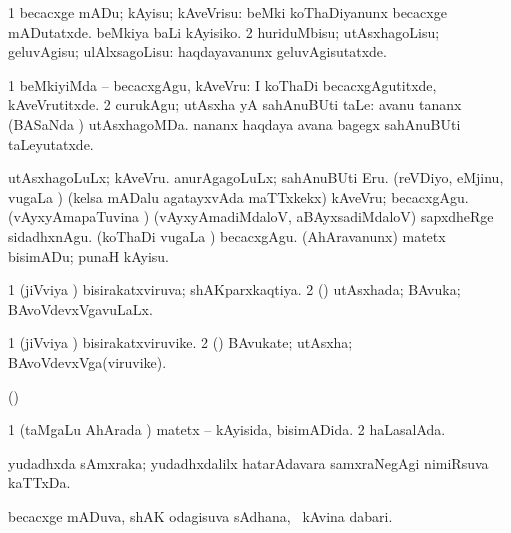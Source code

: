 {\bentry
{} 
\gl{\sakirx}
\expl{}
\bmng
\bnum
\num{1} becacxge mADu; kAyisu; kAveVrisu:  beMki koThaDiyanunx becacxge mADutatxde.  beMkiya baLi kAyisiko. 
\num{2} huriduMbisu; utAsxhagoLisu; geluvAgisu; ulAlxsagoLisu:  haqdayavanunx geluvAgisutatxde. 
\enum
\emng

\noindent 
\gl{\akirx}
\expl{}
\bmng
\bnum
\num{1} beMkiyiMda -- becacxgAgu, kAveVru:  I koThaDi becacxgAgutitxde, kAveVrutitxde. 
\num{2} curukAgu; utAsxha yA sahAnuBUti taLe:  avanu tananx (BASaNda \vi) utAsxhagoMDa.  nananx haqdaya avana bagegx sahAnuBUti taLeyutatxde. 
\enum
\emng

\noindent 
\gl{\pagu}
\expl{}
\bmng
{} 
\banum
{} utAsxhagoLuLx; kAveVru. 
 anurAgagoLuLx; sahAnuBUti Eru. 
 (reVDiyo, eMjinu, \mo vugaLa \vi) (kelsa mADalu agatayxvAda maTTxkekx) kAveVru; becacxgAgu. 
 (vAyxyAmapaTuvina \vi) (vAyxyAmadiMdaloV, aBAyxsadiMdaloV) sapxdheRge sidadhxnAgu. 
 (koThaDi \mo vugaLa \vi) becacxgAgu. 
 (AhAravanunx) matetx bisimADu; punaH kAyisu. 
\eanum
\emng
\eentry

\bentry
{} 
\gl{\gu}
\expl{}
\bmng
\bnum
\num{1} (jiVviya \vi) bisirakatxviruva; shAKparxkaqtiya. 
\num{2} (\rUpa) utAsxhada; BAvuka; BAvoVdevxVgavuLaLx. 
\enum
\emng
\eentry

\bentry
{} 
\gl{\nA}
\expl{}
\bmng
\bnum
\num{1} (jiVviya \vi) bisirakatxviruvike. 
\num{2} (\rUpa) BAvukate; utAsxha; BAvoVdevxVga(viruvike). 
\enum
\emng
\eentry

\bentry
{} 
\gl{\gu}
\expl{}
\bmng
(\ame)  
\emng
\eentry

\bentry
{} 
\gl{\gu}
\expl{}
\bmng
\bnum
\num{1} (taMgaLu AhArada \vi) matetx -- kAyisida, bisimADida. 
\num{2} haLasalAda. 
\enum
\emng
\eentry

\bentry
{} 
\gl{\nA}
\expl{}
\bmng
yudadhxda sAmxraka; yudadhxdalilx hatarAdavara samxraNegAgi nimiRsuva kaTTxDa. 
\emng
\eentry

\bentry
{} 
\gl{\nA}
\expl{}
\bmng
becacxge mADuva, shAK odagisuva sAdhana, \udA\ kAvina dabari. 
\emng
\eentry

}
